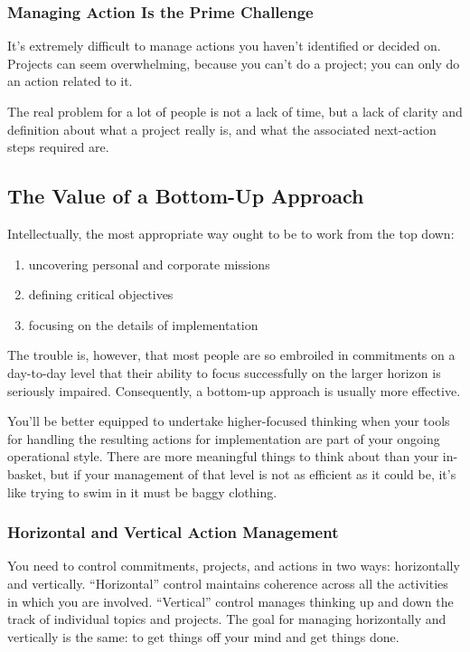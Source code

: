 \documentclass[letterpaper]{article}
\newcommand{\p}{\vspace{1em}\par}		%
\begin{document}
\subsubsection*{Managing Action Is the Prime Challenge}
It's extremely difficult to manage actions you haven't identified or decided on. Projects can seem overwhelming, because you can't do a project; you can only do an action related to it.

\p The real problem for a lot of people is not a lack of time, but a lack of clarity and definition about what a project really is, and what the associated next-action steps required are.

\subsection*{The Value of a Bottom-Up Approach}
Intellectually, the most appropriate way ought to be to work from the top down:
\begin{enumerate}
\item uncovering personal and corporate missions
\item defining critical objectives
\item focusing on the details of implementation
\end{enumerate}
The trouble is, however, that most people are so embroiled in commitments on a day-to-day level that their ability to focus successfully on the larger horizon is seriously impaired. Consequently, a bottom-up approach is usually more effective.

You'll be better equipped to undertake higher-focused thinking when your tools for handling the resulting actions for implementation are part of your ongoing operational style. There are more meaningful things to think about than your in-basket, but if your management of that level is not as efficient as it could be, it's like trying to swim in it must be baggy clothing.

\subsubsection*{Horizontal and Vertical Action Management}
You need to control commitments, projects, and actions in two ways: horizontally and vertically. ``Horizontal'' control maintains coherence across all the activities in which you are involved.
``Vertical'' control manages thinking up and down the track of individual topics and projects.
The goal for managing horizontally and vertically is the same: to get things off your mind and get things done.
\end{document}
